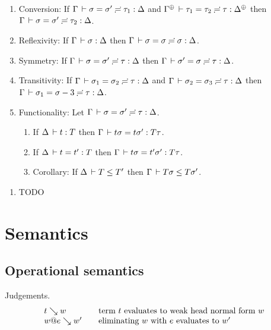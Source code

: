 \documentclass[acmlarge,review,anonymous]{acmart}\settopmatter{printfolios=true}
\begin{document}
\begin{lemma}
\label{lem:subeq}\bla
\begin{enumerate}
\item Conversion: If\/ $\Gamma \,\vdash \sigma = \sigma' \risingdotseq \tau_1 : \Delta$ and $\sueq {\resurrect\Gamma} {\tau_1} {\tau_2} {\tau} {\resurrect\Delta}$ then $\Gamma \,\vdash \sigma = \sigma' \risingdotseq \tau_2 : \Delta$.
\item Reflexivity: If\/ $\Gamma \,\vdash \sigma : \Delta$ then $\Gamma \,\vdash \sigma = \sigma \risingdotseq \sigma : \Delta$.
\item Symmetry:  If\/ $\Gamma \,\vdash \sigma = \sigma' \risingdotseq \tau : \Delta$ then $\Gamma \,\vdash \sigma' = \sigma \risingdotseq \tau : \Delta$.
\item Transitivity:  If\/ $\Gamma \,\vdash \sigma_1 = \sigma_2 \risingdotseq \tau : \Delta$ and $\Gamma \,\vdash \sigma_2 = \sigma_3 \risingdotseq \tau : \Delta$ then $\Gamma \,\vdash \sigma_1 = \sigma-3 \risingdotseq \tau : \Delta$.
\item Functionality: Let $\Gamma \,\vdash \sigma = \sigma' \risingdotseq \tau : \Delta$.
  \begin{enumerate}
  \item
  If $\Delta \,\vdash t : T$ then $\Gamma \,\vdash t\sigma = t\sigma' : T\tau$.
  \item
  If $\Delta \,\vdash t = t' : T$ then $\Gamma \,\vdash t\sigma = t'\sigma' : T\tau$.
  \item
  Corollary: If $\Delta \,\vdash T \leq T'$ then $\Gamma \,\vdash T\sigma \leq T\sigma'$.
  \end{enumerate}
\end{enumerate}
\end{lemma}

\begin{lemma}
\label{lem:invty} \bla
\begin{enumerate}
\item TODO
\end{enumerate}
\end{lemma}




\section{Semantics}
\label{sec:sem}

\subsection{Operational semantics}

Judgements.
\[
\begin{array}{l@{\qquad}l}
  t \evalsto w & \mbox{term $t$ evaluates to weak head normal form $w$} \\
  w @ e \evalsto w' & \mbox{eliminating $w$ with $e$ evaluates to $w'$} \\
\end{array}
\]
\end{document}
